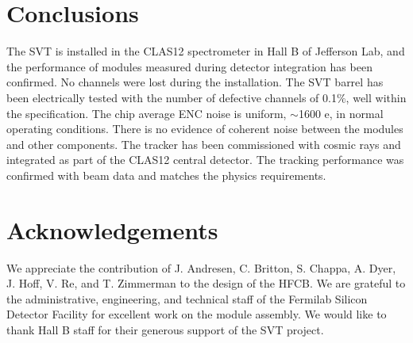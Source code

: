\section{Conclusions}

The SVT is installed in the CLAS12 spectrometer in Hall B of Jefferson Lab, and the performance of modules measured during detector integration has been confirmed. No channels were lost during the installation. The SVT barrel has been electrically  tested with the number of defective channels of 0.1$\%$, well within the specification. The chip average ENC noise is uniform, $\sim$1600 e, in normal operating conditions. There is no evidence of coherent noise between the modules and other components. The tracker has been commissioned with cosmic rays and integrated as part of the CLAS12 central detector. The tracking performance was confirmed with beam data and matches the physics requirements. 

\section{Acknowledgements}

We appreciate the contribution of J.  Andresen, C. Britton, S. Chappa, A. Dyer, J. Hoff, V. Re, and T. Zimmerman to the design of the HFCB. We are grateful to the administrative, engineering, and technical staff of the Fermilab Silicon Detector Facility for excellent work on the module assembly. We would like to thank Hall B staff for their generous support of the SVT project.



